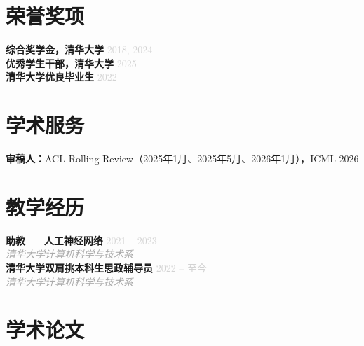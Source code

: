 \documentclass[11pt, a4paper]{article}
\newcommand{\cventry}[4]{%
    \noindent\textbf{#1} \hfill \textcolor{lightgray}{\small #2} \\
    \textit{\textcolor{darkgray}{#3}} \hfill \textcolor{lightgray}{\small #4} \\[-0.3em]
}
\newcommand{\cventryoneline}[2]{%
    \noindent\textbf{#1} \hfill \textcolor{lightgray}{\small #2} \\[-0.3em]
}
\begin{document}
\vspace{-0.6em}

\section{荣誉奖项}
\vspace{-0.2em}

\cventryoneline{综合奖学金，清华大学}{2018, 2024}
\cventryoneline{优秀学生干部，清华大学}{2025}
\cventryoneline{清华大学优良毕业生}{2022}

\vspace{-0.8em}

\section{学术服务}

\noindent\textbf{审稿人：}ACL Rolling Review（2025年1月、2025年5月、2026年1月），ICML 2026

\newpage

\section{教学经历}

\cventry{助教 --- 人工神经网络}{2021 -- 2023}{清华大学计算机科学与技术系}{}
\cventry{清华大学双肩挑本科生思政辅导员}{2022 -- 至今}{清华大学计算机科学与技术系}{}

\vspace{-0.8em}

\section{学术论文}
\end{document}
